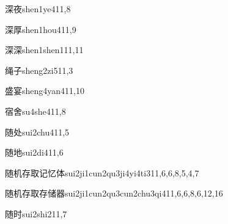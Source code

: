 \begin{verbete}{深夜}{shen1ye4}{11,8}
\end{verbete}

\begin{verbete}{深厚}{shen1hou4}{11,9}
\end{verbete}

\begin{verbete}{深深}{shen1shen1}{11,11}
\end{verbete}

\begin{verbete}{绳子}{sheng2zi5}{11,3}
\end{verbete}

\begin{verbete}{盛宴}{sheng4yan4}{11,10}
\end{verbete}

\begin{verbete}{宿舍}{su4she4}{11,8}
\end{verbete}

\begin{verbete}{随处}{sui2chu4}{11,5}
\end{verbete}

\begin{verbete}{随地}{sui2di4}{11,6}
\end{verbete}

\begin{verbete}{随机存取记忆体}{sui2ji1cun2qu3ji4yi4ti3}{11,6,6,8,5,4,7}
\end{verbete}

\begin{verbete}{随机存取存储器}{sui2ji1cun2qu3cun2chu3qi4}{11,6,6,8,6,12,16}
\end{verbete}

\begin{verbete}{随时}{sui2shi2}{11,7}
\end{verbete}

